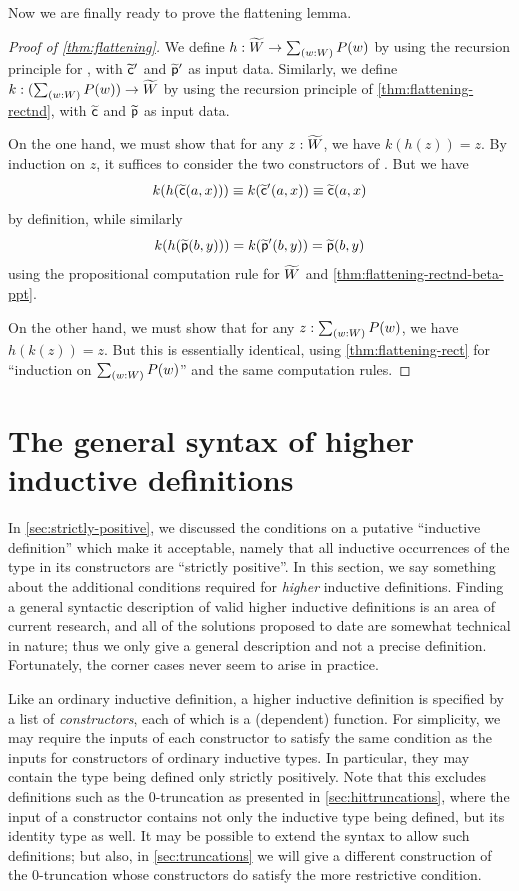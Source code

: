 Now we are finally ready to prove the flattening lemma.

\begin{proof}[Proof of \cref{thm:flattening}]
  We define $h:\Wtil \to \sm{w:W}P(w)$ by using the recursion principle for \Wtil, with $\widetilde{\mathsf{c}}'$ and $\widetilde{\mathsf{p}}'$ as input data.
  Similarly, we define $k:(\sm{w:W}P(w)) \to \Wtil$ by using the recursion principle of \cref{thm:flattening-rectnd}, with $\widetilde{\mathsf{c}}$ and $\widetilde{\mathsf{p}}$ as input data.

  On the one hand, we must show that for any $z:\widetilde{W}$, we have $k(h(z))=z$.
  By induction on $z$, it suffices to consider the two constructors of \Wtil.
  But we have
  \[k(h(\widetilde{\mathsf{c}}(a,x))) \equiv k(\widetilde{\mathsf{c}}'(a,x)) \equiv \widetilde{\mathsf{c}}(a,x)\]
  by definition, while similarly
  \[{k}\mathopen{}\left({{h}\mathopen{}\left({\widetilde{\mathsf{p}}(b,y)}\right)\mathclose{}}\right)\mathclose{} = {k}\mathopen{}\left({\widetilde{\mathsf{p}}'(b,y)}\right)\mathclose{} = \widetilde{\mathsf{p}}(b,y) \]
  using the propositional computation rule for $\widetilde{W}$ and \cref{thm:flattening-rectnd-beta-ppt}.

  On the other hand, we must show that for any $z:\sm{w:W}P(w)$, we have $h(k(z))=z$.
  But this is essentially identical, using \cref{thm:flattening-rect} for ``induction on $\sm{w:W}P(w)$'' and the same computation rules.
\end{proof}

\section{The general syntax of higher inductive definitions}
\label{sec:naturality}

In \cref{sec:strictly-positive}, we discussed the conditions on a putative ``inductive definition'' which make it acceptable, namely that all inductive occurrences of the type in its constructors are ``strictly positive''.
In this section, we say something about the additional conditions required for \emph{higher} inductive definitions.
Finding a general syntactic description of valid higher inductive definitions is an area of current research, and all of the solutions proposed to date are somewhat technical in nature; thus we only give a general description and not a precise definition.
Fortunately, the corner cases never seem to arise in practice.

Like an ordinary inductive definition, a higher inductive definition is specified by a list of \emph{constructors}, each of which is a (dependent) function.
For simplicity, we may require the inputs of each constructor to satisfy the same condition as the inputs for constructors of ordinary inductive types.
In particular, they may contain the type being defined only strictly positively.
Note that this excludes definitions such as the $0$-truncation as presented in \cref{sec:hittruncations}, where the input of a constructor contains not only the inductive type being defined, but its identity type as well.
It may be possible to extend the syntax to allow such definitions; but also, in \cref{sec:truncations} we will give a different construction of the $0$-truncation whose constructors do satisfy the more restrictive condition.


